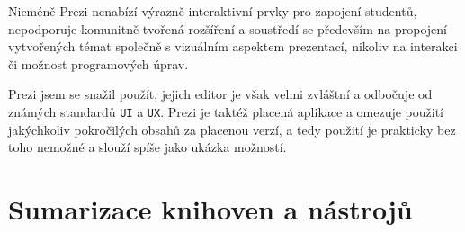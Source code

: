 Nicméně Prezi nenabízí výrazně interaktivní prvky pro zapojení studentů, nepodporuje komunitně tvořená rozšíření a soustředí se především na propojení vytvořených témat společně s vizuálním aspektem prezentací, nikoliv na interakci či možnost programových úprav.

Prezi jsem se snažil použít, jejich editor je však velmi zvláštní a odbočuje od známých standardů \texttt{UI} a \texttt{UX}.
Prezi je taktéž placená aplikace a omezuje použití jakýchkoliv pokročilých obsahů za placenou verzí, a tedy použití je prakticky bez toho nemožné a slouží spíše jako ukázka možností.



\section{Sumarizace knihoven a nástrojů}




